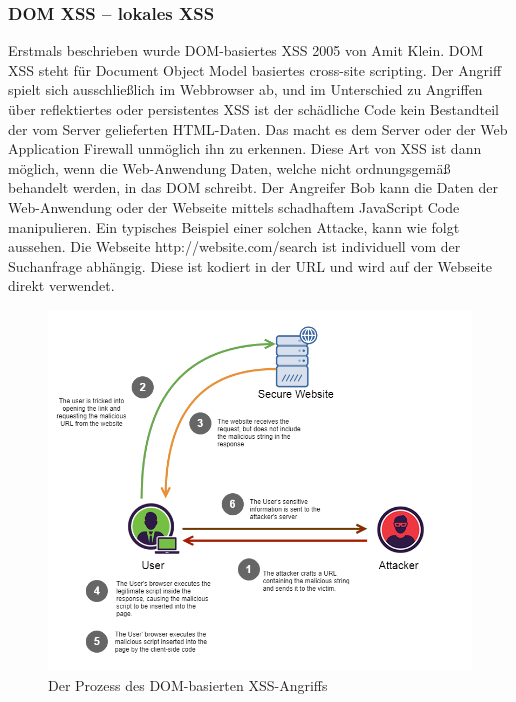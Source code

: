 \subsubsection{DOM XSS – lokales XSS}
\label{subsubsection:dom_xss}

Erstmals beschrieben wurde DOM-basiertes XSS 2005 von Amit Klein. DOM XSS steht für Document Object Model basiertes cross-site scripting. Der Angriff spielt sich ausschließlich im Webbrowser ab, und im Unterschied zu Angriffen über reflektiertes oder persistentes XSS ist der schädliche Code kein Bestandteil der vom Server gelieferten HTML-Daten. Das macht es dem Server oder der Web Application Firewall unmöglich ihn zu erkennen. Diese Art von XSS ist dann möglich, wenn die Web-Anwendung Daten, welche nicht ordnungsgemäß behandelt werden, in das DOM schreibt.
Der Angreifer Bob kann die Daten der Web-Anwendung oder der Webseite mittels schadhaftem JavaScript Code manipulieren.  Ein typisches Beispiel einer solchen Attacke, kann wie folgt aussehen. Die Webseite http://website.com/search ist individuell vom der Suchanfrage abhängig. Diese ist kodiert in der URL und wird auf der Webseite direkt verwendet.

\begin{figure}[ht]
	\centering
	\includegraphics[width=1\linewidth]{images/medium/3_dom_xss.png}
	\caption[Der Prozess des DOM-basierten XSS-Angriffs]
	{Der Prozess des DOM-basierten XSS-Angriffs \autocite{makarem2018}}
\end{figure}


